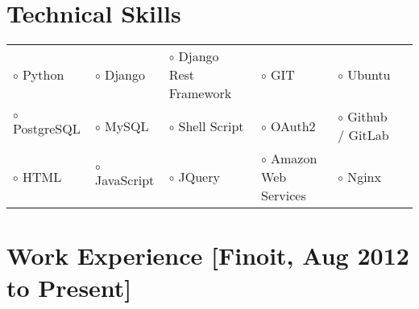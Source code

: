 \documentclass[11pt]{article}
\begin{document}
\section*{Technical Skills}

\begin{tabular}{l l l l l l}
 $\circ$ Python &
 $\circ$ Django &
 $\circ$ Django Rest Framework &
 $\circ$ GIT &
 $\circ$ Ubuntu \\
 $\circ$ PostgreSQL &
 $\circ$ MySQL &
 $\circ$ Shell Script &
 $\circ$ OAuth2 &
 $\circ$ Github / GitLab \\
 $\circ$ HTML &
 $\circ$ JavaScript &
 $\circ$ JQuery &
 $\circ$ Amazon Web Services &
 $\circ$ Nginx \\
\end{tabular}

\section*{Work Experience [Finoit, Aug 2012 to Present]}
\end{document}
